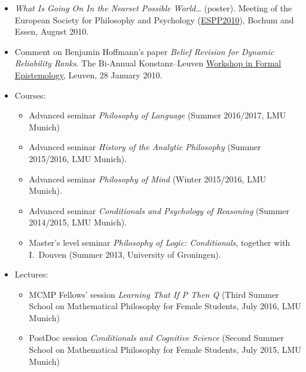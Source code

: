 \documentclass[a4paper,12pt]{article}
\begin{document}
\begin{small}
\begin{itemize}
  \item \emph{What Is Going On In the Nearset Possible World\ldots} (poster). 
  Meeting of the European Society for Philosophy and  Psychology
    (\href{http://www.ruhr-uni-bochum.de/philosophy/espp2010/index.html}{ESPP2010}),
    Bochum and Essen, August 2010.

  \item Comment on Benjamin Hoffmann's paper \emph{Belief Revision for
      Dynamic Reliability Ranks}. The Bi-Annual Konstanz--Leuven
    \href{http://formalphilosophy.org/node/580}{Workshop in Formal
      Epistemology}, Leuven, 28 January 2010.
  \end{itemize}

  



  
  
  \begin{itemize}
    \item Courses:
      \begin{itemize}
      	\item Advanced seminar \emph{Philosophy of Language} (Summer 2016/2017, LMU Munich)
        \item Advanced seminar \emph{History of the Analytic Philosophy} (Summer 2015/2016, LMU Munich).
        \item Advanced seminar \emph{Philosophy of Mind} (Winter 2015/2016, LMU Munich).
        \item Advanced seminar \emph{Conditionals and Psychology of Reasoning} (Summer 2014/2015, LMU Munich).
        \item Master's level seminar \emph{Philosophy of Logic: Conditionals}, together with I.~Douven (Summer 2013, University of Groningen).
     \end{itemize}
    \item Lectures:
      \begin{itemize}
         \item MCMP Fellows' session \emph{Learning That If P Then Q} (Third Summer School on Mathematical Philosophy for Female Students, July 2016, LMU Munich)
         \item PostDoc session \emph{Conditionals and Cognitive Science} (Second Summer School on Mathematical Philosophy for Female Students, July 2015, LMU Munich)
      \end{itemize}
  \end{itemize}
  



\end{small}
\end{document}
